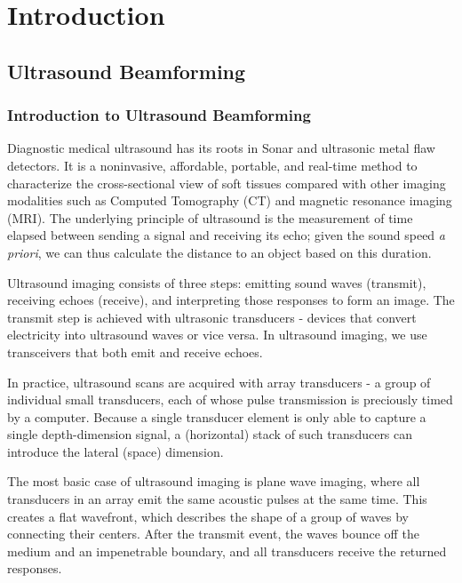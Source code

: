 \chapter{Introduction}

\section{Ultrasound Beamforming}


\subsection{Introduction to Ultrasound Beamforming}
 Diagnostic medical ultrasound has its roots in Sonar and ultrasonic metal flaw detectors. It is a noninvasive, affordable, portable, and real-time method to characterize the cross-sectional view of soft tissues compared with other imaging modalities such as Computed Tomography (CT) and magnetic resonance imaging (MRI). The underlying principle of ultrasound is the measurement of time elapsed between sending a signal and receiving its echo; given the sound speed \textit{a priori}, we can thus calculate the distance to an object based on this duration.

 Ultrasound imaging consists of three steps: emitting sound waves (transmit), receiving echoes (receive), and interpreting those responses to form an image. The transmit step is achieved with ultrasonic transducers - devices that convert electricity into ultrasound waves or vice versa. In ultrasound imaging, we use transceivers that both emit and receive echoes.

 In practice, ultrasound scans are acquired with array transducers - a group of individual small transducers, each of whose pulse transmission is preciously timed by a computer. Because a single transducer element is only able to capture a single depth-dimension signal, a (horizontal) stack of such transducers can introduce the lateral (space) dimension.

 The most basic case of ultrasound imaging is plane wave imaging, where all transducers in an array emit the same acoustic pulses at the same time. This creates a flat wavefront, which describes the shape of a group of waves by connecting their centers. After the transmit event, the waves bounce off the medium and an impenetrable boundary, and all transducers receive the returned responses.


